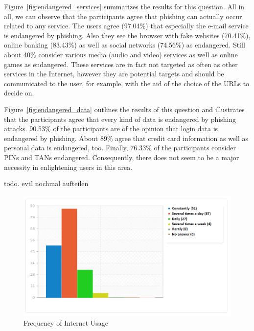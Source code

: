 \begin{description}[leftmargin=0cm]
	\item[Services endangered by phishing] Figure~\ref{fig:endangered_services} summarizes the results for this question. All in all, we can observe that the participants agree that phishing can actually occur related to any service. The users agree (97.04\%) that especially the e-mail service is endangered by phishing. Also they see the browser with fake websites (70.41\%), online banking (83.43\%) as well as social networks (74.56\%) as endangered. Still about 40\% consider various media (audio and video) services as well as online games as endangered. These services are in fact not targeted as often as other services in the Internet, however they are potential targets and should be communicated to the user, for example, with the aid of the choice of the URLs to decide on.
	\item[Data endangered by phishing] Figure~\ref{fig:endangered_data} outlines the results of this question and illustrates that the participants agree that every kind of data is endangered by phishing attacks. 90.53\% of the participants are of the opinion that login data is endangered by phishing. About 89\% agree that credit card information as well as personal data is endangered, too. Finally, 76.33\% of the participants consider PINs and TANs endangered. Consequently, there does not seem to be a major necessity in enlightening users in this area.
	\item[Preferences for an education app] todo. evtl nochmal aufteilen
\end{description}


\begin{figure}[hHtbp]
\includegraphics[width=1.0\textwidth]{graphix/internet_usage.png}%
\caption{Frequency of Internet Usage}%
\label{fig:internet_usage}%
\end{figure}


